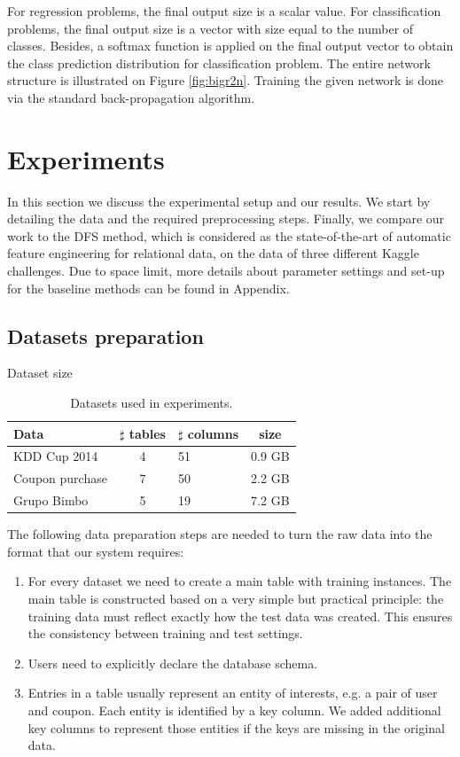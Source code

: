For regression problems, the final output size is a scalar value. For classification problems, the final output size is a vector with size equal to the number of classes. Besides, a softmax function is applied on the final output vector to obtain the class prediction distribution for classification problem. The entire network structure is illustrated on Figure \ref{fig:bigr2n}. Training the given network is done via the standard back-propagation algorithm.
   
\section{Experiments}
In this section we discuss the experimental setup and our results. We start by detailing the data and the required preprocessing steps.
Finally, we compare our work to the DFS method, which is considered as the state-of-the-art of automatic feature engineering for relational data, on the data of three different Kaggle challenges.  Due to space limit, more details about parameter settings and set-up for the baseline methods can be found in Appendix. 
\subsection{Datasets preparation}
\begin{table}
  \caption {Dataset size} \label{tab:data size} 
  \begin{tabular}{ | l | c | l | c |}
    \hline
    \textbf{Data} & \textbf{$\sharp$ tables} & \textbf{$\sharp$ columns} & \textbf{size} \\ \hline
    KDD Cup 2014 & 4 & 51 & 0.9  GB \\ \hline    
    Coupon purchase &  7 &  50 & 2.2 GB   \\ \hline 
    Grupo Bimbo &  5 &  19 & 7.2 GB   \\ \hline        	
  \end{tabular}   
  \caption{Datasets used in experiments.} 
\end{table}

The following data preparation steps are needed to turn the raw data into the format that our system requires:
\begin{enumerate}
\item For every dataset we need to create a main table with training instances.  The main table is constructed  based on a very simple but practical principle: the training data must reflect exactly how the test data was created. This ensures the consistency between training and test settings.  
\item Users need to explicitly declare the database schema. 
\item Entries in a table usually represent an entity of interests, e.g. a pair of user and coupon. Each entity is identified by a key column. We added additional key columns to represent those entities if the keys are missing in the original data. 
\end{enumerate}

